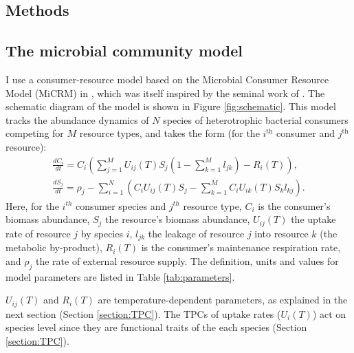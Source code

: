 \documentclass[11pt, a4paper]{article}
\begin{document}
\begin{spacing}{1.5}
\section{Methods}

\subsection{The microbial community model}

I use a consumer-resource model based on the Microbial Consumer Resource Model (MiCRM) in \cite{marsland2019available}, which was itself inspired by the seminal work of \cite{macarthur1970species}. The schematic diagram of the model is shown in Figure \ref{fig:schematic}. This model tracks the abundance dynamics of $N$ species of heterotrophic bacterial consumers competing for $M$ resource types, and takes the form (for the $i^\text{th}$ consumer and $j^\text{th}$ resource):
\begin{align}\label{eq:community}
    \frac{dC_i}{dt} = C_i\left(\sum_{j=1}^{M}U_{ij}(T)S_j(1-\sum_{k=1}^{M}l_{jk}) - R_i(T)\right), \\
    \frac{dS_j}{dt} = \rho_j - \sum_{i=1}^{N}\left(C_iU_{ij}(T)S_j-\sum_{k=1}^{M}C_iU_{ik}(T)S_kl_{kj}\right).
\end{align}
Here, for the $i^{th}$ consumer species and $j^{th}$ resource type, $C_i$ is the consumer's biomass abundance, $S_j$ the resource's biomass abundance, $U_{ij}(T)$ the uptake rate of resource $j$ by species $i$, $l_{jk}$ the leakage of resource $j$ into resource $k$ (the metabolic by-product), $R_i(T)$ is the consumer's maintenance respiration rate,  and $\rho_j$ the rate of external resource supply. The definition, units and values for model parameters are listed in Table \ref{tab:parameters}. 

$U_{ij}(T)$ and $R_i(T)$ are temperature-dependent parameters, as explained in the next section (Section \ref{section:TPC}). The TPCs of uptake rates ($U_i(T)$) act on species level since they are functional traits of the each species (Section \ref{section:TPC}). 


\end{spacing}
\end{document}
